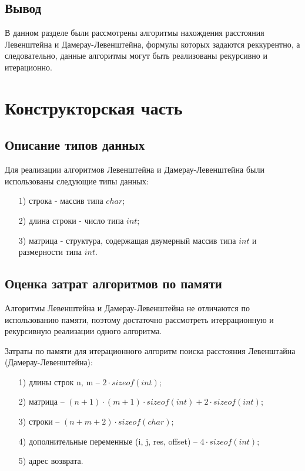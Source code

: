 \documentclass[a4paper,14pt, unknownkeysallowed]{extreport}
\begin{document}
	
\section*{Вывод}
	
В данном разделе были рассмотрены алгоритмы нахождения расстояния Левенштейна и Дамерау-Левенштейна, формулы которых задаются реккурентно, а следовательно, данные алгоритмы могут быть реализованы рекурсивно и итерационно.
	
\clearpage
	
\chapter{Конструкторская часть}
	
\section{Описание типов данных}
	
Для реализации алгоритмов Левенштейна и Дамерау-Левенштейна были использованы следующие типы данных:

\begin{enumerate}
    \item[1)] строка - массив типа $char$;
    \item[2)] длина строки - число типа $int$;
    \item[3)] матрица - структура, содержащая двумерный массив типа $int$ и размерности типа $int$.
\end{enumerate}
	
\section{Оценка затрат алгоритмов по памяти}
	
Алгоритмы Левенштейна и Дамерау-Левенштейна не отличаются по использованию памяти, поэтому достаточно рассмотреть итеррационную и рекурсивную реализации одного алгоритма.

Затраты по памяти для итерационного алгоритм поиска расстояния Левенштайна (Дамерау-Левенштейна):

	\begin{enumerate}
	\item[1)] длины строк n, m -- $2 \cdot sizeof(int)$;
	\item[2)] матрица -- $(n + 1) \cdot (m + 1) \cdot sizeof(int) + 2 \cdot sizeof(int)$;
	\item[3)] строки -- $(n + m + 2) \cdot sizeof(char)$;
	\item[4)] дополнительные переменные (i, j, res, offset) -- $4 \cdot sizeof(int)$; 
	\item[5)] адрес возврата.
	\end{enumerate}
	
\end{document}
